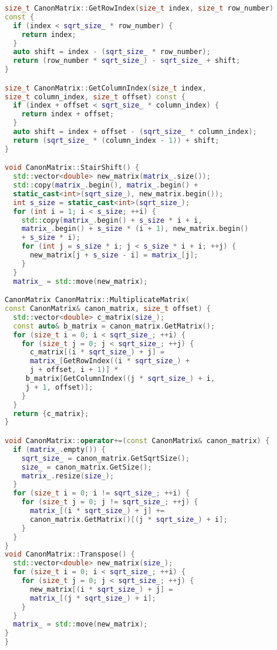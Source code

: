 \documentclass[12pt]{article}
\begin{document}
\begin{lstlisting}[language=C++]
size_t CanonMatrix::GetRowIndex(size_t index, size_t row_number) 
const {
  if (index < sqrt_size_ * row_number) {
    return index;
  }
  auto shift = index - (sqrt_size_ * row_number);
  return (row_number * sqrt_size_) - sqrt_size_ + shift;
}

size_t CanonMatrix::GetColumnIndex(size_t index, 
size_t column_index, size_t offset) const {
  if (index + offset < sqrt_size_ * column_index) {
    return index + offset;
  }
  auto shift = index + offset - (sqrt_size_ * column_index);
  return (sqrt_size_ * (column_index - 1)) + shift;
}

void CanonMatrix::StairShift() {
  std::vector<double> new_matrix(matrix_.size());
  std::copy(matrix_.begin(), matrix_.begin() + 
  static_cast<int>(sqrt_size_), new_matrix.begin());
  int s_size = static_cast<int>(sqrt_size_);
  for (int i = 1; i < s_size; ++i) {
    std::copy(matrix_.begin() + s_size * i + i, 
    matrix_.begin() + s_size * (i + 1), new_matrix.begin() 
    + s_size * i);
    for (int j = s_size * i; j < s_size * i + i; ++j) {
      new_matrix[j + s_size - i] = matrix_[j];
    }
  }
  matrix_ = std::move(new_matrix);

CanonMatrix CanonMatrix::MultiplicateMatrix(
const CanonMatrix& canon_matrix, size_t offset) {
  std::vector<double> c_matrix(size_);
  const auto& b_matrix = canon_matrix.GetMatrix();
  for (size_t i = 0; i < sqrt_size_; ++i) {
    for (size_t j = 0; j < sqrt_size_; ++j) {
      c_matrix[(i * sqrt_size_) + j] = 
      matrix_[GetRowIndex((i * sqrt_size_) +
      j + offset, i + 1)] *
     b_matrix[GetColumnIndex((j * sqrt_size_) + i, 
     j + 1, offset)];
    }
  }
  return {c_matrix};
}

void CanonMatrix::operator+=(const CanonMatrix& canon_matrix) {
  if (matrix_.empty()) {
    sqrt_size_ = canon_matrix.GetSqrtSize();
    size_ = canon_matrix.GetSize();
    matrix_.resize(size_);
  }
  for (size_t i = 0; i != sqrt_size_; ++i) {
    for (size_t j = 0; j != sqrt_size_; ++j) {
      matrix_[(i * sqrt_size_) + j] += 
      canon_matrix.GetMatrix()[(j * sqrt_size_) + i];
    }
  }
}
void CanonMatrix::Transpose() {
  std::vector<double> new_matrix(size_);
  for (size_t i = 0; i < sqrt_size_; ++i) {
    for (size_t j = 0; j < sqrt_size_; ++j) {
      new_matrix[(i * sqrt_size_) + j] = 
      matrix_[(j * sqrt_size_) + i];
    }
  }
  matrix_ = std::move(new_matrix);
}
}
\end{lstlisting} 
\end{document}
